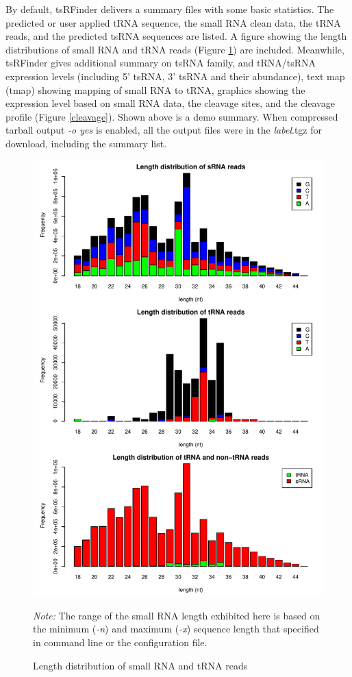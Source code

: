 \documentclass[11pt, a4paper]{article}
\begin{document}
By default, tsRFinder delivers a summary files with some basic statistics. The predicted or user applied tRNA sequence, the small RNA clean data, the tRNA reads, and the predicted tsRNA sequences are listed. A figure showing the length distributions of small RNA and tRNA reads (Figure \ref{distribution}) are included. Meanwhile, tsRFinder gives additional summary on tsRNA family, and tRNA/tsRNA expression levels (including 5' tsRNA, 3' tsRNA and their abundance), text map (tmap) showing mapping of small RNA to tRNA, graphics showing the expression level based on small RNA data, the cleavage sites, and the cleavage profile (Figure \ref{cleavage}).
Shown above is a demo summary. When compressed tarball output \emph{-o yes} is enabled, all the output files were in the \emph{label}.tgz for download, including the summary list.

\begin{figure}[htbp]
\begin{center}
\includegraphics[width=12cm]{distribution.pdf}
\caption{Length distribution of small RNA and tRNA reads}
\label{distribution}
\end{center}
\emph{Note:} The range of the small RNA length exhibited here is based on the minimum (\emph{-n}) and maximum (\emph{-x}) sequence length that specified in command line or the configuration file.
\end{figure}
\end{document}

